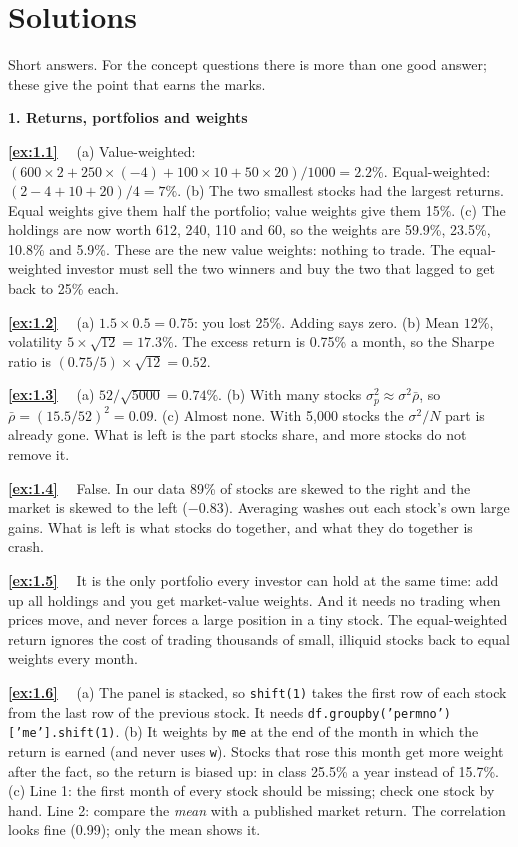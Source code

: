 \documentclass[11pt]{article}
\newcounter{ex}[section]
\newcommand{\sol}[1]{\par\smallskip\textbf{\ref{#1}}\ \ }
\newcommand{\head}[1]{\par\medskip\textbf{#1}\par}
\begin{document}
\section*{Solutions}
{\small
Short answers. For the concept questions there is more than one good answer; these give the point that earns the marks.

\head{1. Returns, portfolios and weights}

\sol{ex:1.1} (a) Value-weighted: $(600\times 2 + 250\times(-4) + 100\times 10 + 50\times 20)/1000 = 2.2\%$. Equal-weighted:
$(2 - 4 + 10 + 20)/4 = 7\%$. (b) The two smallest stocks had the largest returns. Equal weights give them half the
portfolio; value weights give them 15\%. (c) The holdings are now worth 612, 240, 110 and 60, so the weights are 59.9\%,
23.5\%, 10.8\% and 5.9\%. These are the new value weights: nothing to trade. The equal-weighted investor must sell the
two winners and buy the two that lagged to get back to 25\% each.

\sol{ex:1.2} (a) $1.5\times 0.5 = 0.75$: you lost 25\%. Adding says zero. (b) Mean $12\%$, volatility $5\times\sqrt{12} =
17.3\%$. The excess return is 0.75\% a month, so the Sharpe ratio is $(0.75/5)\times\sqrt{12} = 0.52$.

\sol{ex:1.3} (a) $52/\sqrt{5000} = 0.74\%$. (b) With many stocks $\sigma_{p}^{2} \approx \sigma^{2}\bar\rho$, so
$\bar\rho = (15.5/52)^{2} = 0.09$. (c) Almost none. With 5{,}000 stocks the $\sigma^{2}/N$ part is already gone. What is left
is the part stocks share, and more stocks do not remove it.

\sol{ex:1.4} False. In our data 89\% of stocks are skewed to the right and the market is skewed to the left ($-0.83$).
Averaging washes out each stock's own large gains. What is left is what stocks do together, and what they do together
is crash.

\sol{ex:1.5} It is the only portfolio every investor can hold at the same time: add up all holdings and you get
market-value weights. And it needs no trading when prices move, and never forces a large position in a tiny stock. The
equal-weighted return ignores the cost of trading thousands of small, illiquid stocks back to equal weights every month.

\sol{ex:1.6} (a) The panel is stacked, so \texttt{shift(1)} takes the first row of each stock from the last row of the
previous stock. It needs \texttt{df.groupby('permno')['me'].shift(1)}. (b) It weights by \texttt{me} at the end of the
month in which the return is earned (and never uses \texttt{w}). Stocks that rose this month get more weight after the
fact, so the return is biased up: in class 25.5\% a year instead of 15.7\%. (c) Line 1: the first month of every stock
should be missing; check one stock by hand. Line 2: compare the \emph{mean} with a published market return. The
correlation looks fine (0.99); only the mean shows it.

}
\end{document}
